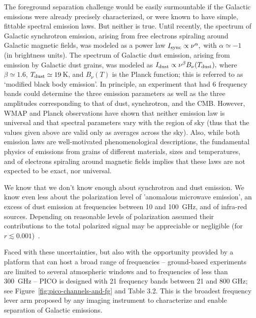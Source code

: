 \documentclass[PICOReport.tex]{subfiles}
\begin{document}
The foreground separation challenge would be easily surmountable if the Galactic emissions were already precisely characterized, or were known to have simple, fittable spectral emission laws. But neither is true. Until recently, the spectrum of Galactic synchrotron emission, arising from free electrons spiraling around Galactic magnetic fields, was modeled as a power law $I_{\rm sync} \propto \nu^{\alpha},$ with $\alpha \simeq -1$ (in brightness units). The spectrum of Galactic dust emission, arising from emission by Galactic dust grains, was modeled as $I_{\rm dust} \propto \nu^{\beta} B_\nu(T_{\rm dust}),$ where $\beta \simeq 1.6$, $T_{\rm dust} \simeq 19$\,K, and $B_\nu(T)$ is the Planck function; this is referred to as `modified black body emission'.  In principle, an experiment that had 6 frequency bands could determine the three emission parameters as well as the three amplitudes corresponding to that of dust, synchrotron, and the CMB. However, WMAP and Planck observations have shown that neither emission law is universal and that spectral parameters vary with the region of sky  (thus that the values given above are valid only as averages across the sky). Also, while both emission laws are well-motivated phenomenological descriptions, the fundamental physics of emissions from grains of different materials, sizes and temperatures, and of electrons spiraling around magnetic fields implies that these laws are not expected to be exact, nor universal. 

We know that we don't know enough about synchrotron and dust emission. We know even less about the polarization level of 'anomalous microwave emission', an excess of dust emission at frequencies between 10 and 100~GHz, and of infra-red sources. Depending on reasonable levels of polarization assumed their contributions to the total polarized signal may be appreciable or negligible (for $r\lesssim 0.001$)~\citep{??}.  

Faced with these uncertainties, but also with the opportunity provided by a platform that can host a broad range of frequencies -- ground-based experiments are limited to several atmospheric windows and to frequencies of less than 300~GHz -- PICO is designed with 21 frequency bands between 21 and 800 GHz; see Figure~\ref{fig:pico-channels-and-fg} and Table 3.2. This is the broadest frequency lever arm proposed by any imaging instrument to characterize and enable separation of Galactic emissions. 
\end{document}
